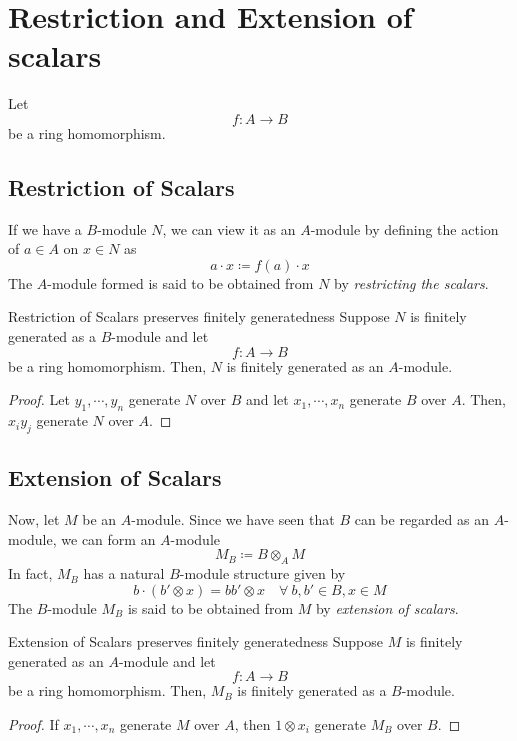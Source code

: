 \pagebreak

\section{Restriction and Extension of scalars}

Let
\[
	f \colon A \to B
\]
be a ring homomorphism.

\subsection{Restriction of Scalars}
If we have a \(B\)-module \(N\), we can view it as an \(A\)-module
by defining the action of \(a \in A\) on \(x \in N\) as
\[
	a \cdot x \coloneqq f(a) \cdot x
\]
The \(A\)-module formed is said to be obtained from \(N\) by
\emph{restricting the scalars}.

\begin{proposition}{Restriction of Scalars preserves finitely generatedness}{}
	Suppose \(N\) is finitely generated as a \(B\)-module and let
	\[
		f \colon A \to B
	\]
	be a ring homomorphism.
	Then, \(N\) is finitely generated as an \(A\)-module.
\end{proposition}
\begin{proof}
	Let \(y_1, \cdots, y_n\) generate \(N\) over \(B\) and let \(x_1,
	\cdots, x_n\) generate \(B\) over \(A\).
	Then, \(x_i y_j\) generate \(N\) over \(A\).
\end{proof}

\subsection{Extension of Scalars}
Now, let \(M\) be an \(A\)-module.
Since we have seen that \(B\) can be regarded as an \(A\)-module,
we can form an \(A\)-module
\[
	M_B \coloneqq B \otimes_A M
\]
In fact, \(M_B\) has a natural \(B\)-module structure given by
\[
	b \cdot (b' \otimes x) = b b' \otimes x
	\quad \forall\ b, b' \in B, x \in M
\]
The \(B\)-module \(M_B\) is said to be obtained from \(M\) by
\emph{extension of scalars}.

\begin{proposition}{Extension of Scalars preserves finitely generatedness}{}
	Suppose \(M\) is finitely generated as an \(A\)-module and let
	\[
		f \colon A \to B
	\]
	be a ring homomorphism.
	Then, \(M_B\) is finitely generated as a \(B\)-module.
\end{proposition}

\begin{proof}
	If \(x_1, \cdots, x_n\) generate \(M\) over \(A\), then
	\(1 \otimes x_i\) generate \(M_B\) over \(B\).
\end{proof}

